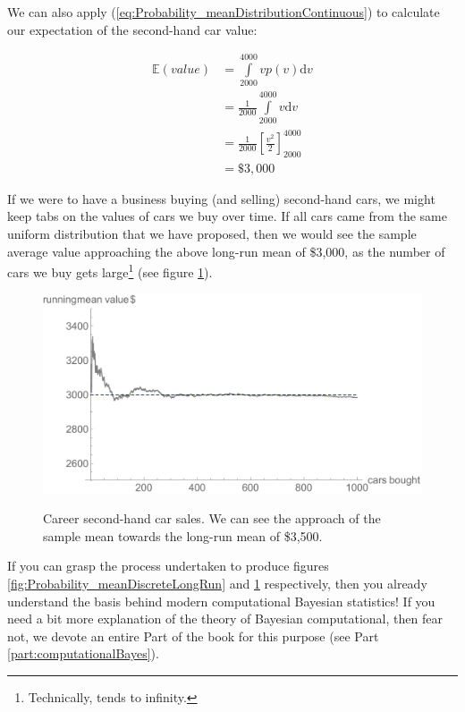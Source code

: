 \documentclass[11pt,fullpage]{book}
\begin{document}
We can also apply (\ref{eq:Probability_meanDistributionContinuous}) to calculate our expectation of the second-hand car value:

\begin{equation}\label{eq:Probability_meanCoinContinuous}
\begin{align}
\mathbb{E}(value) &= \int\limits_{2000}^{4000} v p(v)\mathrm{d}v\\
&=\frac{1}{2000} \int\limits_{2000}^{4000} v \mathrm{d}v\\
&= \frac{1}{2000}\left[\frac{v^2}{2}\right]^{4000}_{2000}\\ 
&= \$3,000
\end{align}
\end{equation}

If we were to have a business buying (and selling) second-hand cars, we might keep tabs on the values of cars we buy over time. If all cars came from the same uniform distribution that we have proposed, then we would see the sample average value approaching the above long-run mean of \$3,000, as the number of cars we buy gets large\footnote{Technically, tends to infinity.} (see figure \ref{fig:Probability_meanContinuousLongRun}).

\begin{figure}
\centering
\scalebox{0.55} 
{\includegraphics{Probability_meanContinuousLongRun.pdf}}
\caption{Career second-hand car sales. We can see the approach of the sample mean towards the long-run mean of \$3,500.}\label{fig:Probability_meanContinuousLongRun}
\end{figure}

If you can grasp the process undertaken to produce figures \ref{fig:Probability_meanDiscreteLongRun} and \ref{fig:Probability_meanContinuousLongRun} respectively, then you already understand the basis behind modern computational Bayesian statistics! If you need a bit more explanation of the theory of Bayesian computational, then fear not, we devote an entire Part of the book for this purpose (see Part \ref{part:computationalBayes}).  
\end{document}
